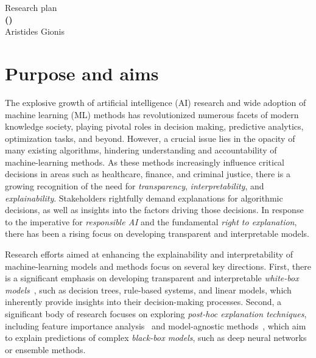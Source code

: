 \documentclass[a4paper,11pt]{article}
\begin{document}
\begin{center} 
{\Large Research plan} \vspace{3mm}\\
{\Large\bf {\proposaltitle} {\sc (}{\acronymtitle}{\sc )}}  \vspace{3mm} \\
{\Large Aristides Gionis} 
\end{center}


\section{Purpose and aims}


The explosive growth of artificial intelligence (AI) research and wide adoption of machine learning (ML) methods 
has revolutionized numerous facets of modern knowledge society, 
playing pivotal roles in decision making, predictive analytics, optimization tasks, and beyond. 
However, a crucial issue lies in the opacity of many existing algorithms, 
hindering understanding and accountability of machine-learning methods. 
As these methods increasingly influence critical decisions in areas such as 
healthcare, finance, and criminal justice, 
there is a growing recognition of the need for \emph{transparency}, 
\emph{interpretability}, and \emph{explainability}.
Stakeholders rightfully demand explanations for algorithmic decisions, 
as well as insights into the factors driving those decisions. 
In response to the imperative for \emph{responsible AI} and the fundamental \emph{right to explanation}, 
there has been a rising focus on developing transparent and interpretable models.

Research efforts aimed at enhancing the explainability and interpretability 
of machine-learning models and methods focus on several key directions. 
First, there is a significant emphasis on developing transparent and interpretable 
\emph{white-box models}~\cite{loyola2019black}, 
such as decision trees, rule-based systems, and linear models, 
which inherently provide insights into their decision-making processes. 
Second, a significant body of research focuses on exploring \emph{post-hoc explanation techniques}, 
including feature importance analysis~\cite{lundberg2017unified} and 
model-agnostic methods~\cite{ribeiro2016model}, 
which aim to explain predictions of complex \emph{black-box models}, 
such as deep neural networks or ensemble methods.
\end{document}
